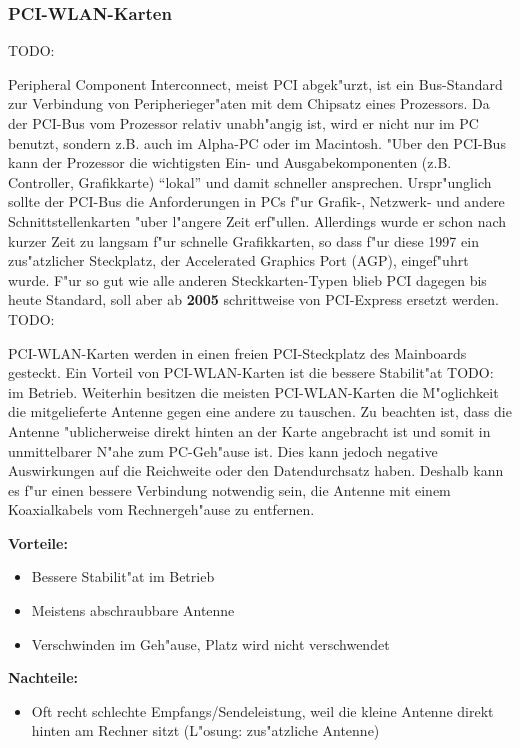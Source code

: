 \subsubsection{PCI-WLAN-Karten}

TODO: 

Peripheral Component Interconnect, meist PCI abgek"urzt, ist ein
Bus-Standard zur Verbindung von Peripherieger"aten mit dem Chipsatz
eines Prozessors. Da der PCI-Bus vom Prozessor relativ unabh"angig ist,
wird er nicht nur im PC benutzt, sondern z.B. auch im Alpha-PC oder
im Macintosh. "Uber den PCI-Bus kann der Prozessor die wichtigsten Ein-
und Ausgabekomponenten (z.B. Controller, Grafikkarte) "`lokal"' und damit
schneller ansprechen. Urspr"unglich sollte der PCI-Bus die Anforderungen in
PCs f"ur Grafik-, Netzwerk- und andere Schnittstellenkarten "uber l"angere
Zeit erf"ullen. Allerdings wurde er schon nach kurzer Zeit zu langsam f"ur
schnelle Grafikkarten, so dass f"ur diese 1997 ein zus"atzlicher Steckplatz,
der Accelerated Graphics Port (AGP), eingef"uhrt wurde. F"ur so gut wie
alle anderen Steckkarten-Typen blieb PCI dagegen bis heute Standard, soll
aber ab \textbf{2005} schrittweise von PCI-Express ersetzt werden.
TODO: 

PCI-WLAN-Karten werden in einen freien PCI-Steckplatz des Mainboards
gesteckt.
Ein Vorteil von PCI-WLAN-Karten ist die bessere Stabilit"at 
TODO: im
Betrieb. Weiterhin besitzen die meisten PCI-WLAN-Karten die M"oglichkeit
die mitgelieferte Antenne gegen eine andere zu tauschen. Zu beachten ist,
dass die Antenne "ublicherweise direkt hinten an der Karte angebracht
ist und somit in unmittelbarer N"ahe zum PC-Geh"ause ist. Dies kann
jedoch negative Auswirkungen auf die Reichweite oder den Datendurchsatz
haben. Deshalb kann es f"ur einen bessere Verbindung notwendig sein,
die Antenne mit einem Koaxialkabels vom Rechnergeh"ause zu entfernen.

\textbf{Vorteile:}

\begin{itemize}
	\item Bessere Stabilit"at im Betrieb
	\item Meistens abschraubbare Antenne
	\item Verschwinden im Geh"ause, Platz wird nicht verschwendet 
\end{itemize}

\textbf{Nachteile:}

\begin{itemize}
	\item Oft recht schlechte Empfangs/Sendeleistung, weil die kleine Antenne
				direkt hinten am Rechner sitzt (L"osung: zus"atzliche Antenne)
\end{itemize}

